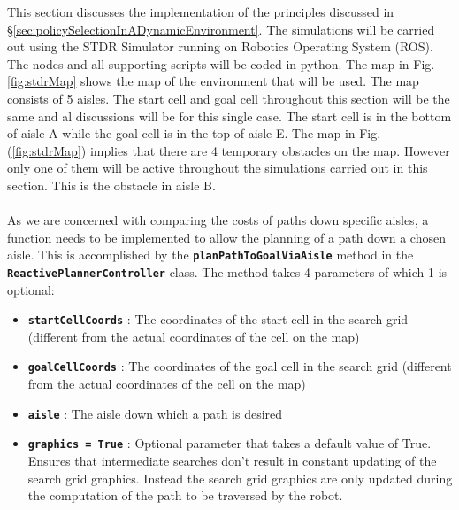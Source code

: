 \documentclass[a4paper,12pt]{article}
\begin{document}
			This section discusses the implementation of the principles discussed in \S \ref{sec:policySelectionInADynamicEnvironment}. The simulations will be carried out using the STDR Simulator running on Robotics Operating System (ROS). The nodes and all supporting scripts will be coded in python. The map in Fig. \ref{fig:stdrMap} shows the map of the environment that will be used. The map consists of 5 aisles. The start cell and goal cell throughout this section will be the same and al discussions will be for this single case. The start cell is in the bottom of aisle A while the goal cell is in the top of aisle E. The map in Fig. (\ref{fig:stdrMap}) implies that there are 4 temporary obstacles on the map. However only one of them will be active throughout the simulations carried out in this section. This is the obstacle in aisle B.
			\\
			\\
			As we are concerned with comparing the costs of paths down specific aisles, a function needs to be implemented to allow the planning of a path down a chosen aisle. This is accomplished by the \texttt{\textbf{planPathToGoalViaAisle}} method in the \texttt{\textbf{ReactivePlannerController}} class. The method takes 4 parameters of which 1 is optional:
			\begin{itemize}
				\item \textbf{\texttt{startCellCoords}} : The coordinates of the start cell in the search grid (different from the actual coordinates of the cell on the map)
				\item \textbf{\texttt{goalCellCoords}} : The coordinates of the goal cell in the search grid (different from the actual coordinates of the cell on the map)
				\item \textbf{\texttt{aisle}} : The aisle down which a path is desired
				\item \textbf{\texttt{graphics = True}} : Optional parameter that takes a default value of True. Ensures that intermediate searches don't result in constant updating of the search grid graphics. Instead the search grid graphics are only updated during the computation of the path to be traversed by the robot. 
			\end{itemize} 
			
\end{document}
